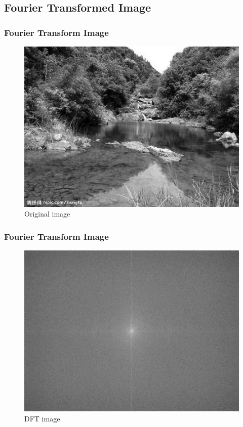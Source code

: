 \documentclass[notheorems, serif, table, compress]{beamer}  %
\begin{document}

\subsection{Fourier Transformed Image}%
 \begin{frame}
\frametitle{Fourier Transform Image}
\begin{figure}
 \centering
 \caption{Original image}
 \includegraphics[width=0.8\linewidth]{orgn.png} 
 \end{figure}

 \end{frame}

\begin{frame}
\frametitle{Fourier Transform Image}
\begin{figure}
 \centering
 \caption{DFT image}
 \includegraphics[width=0.8\linewidth]{magnitude.png} 
 \end{figure}
 \end{frame}
\end{document}

